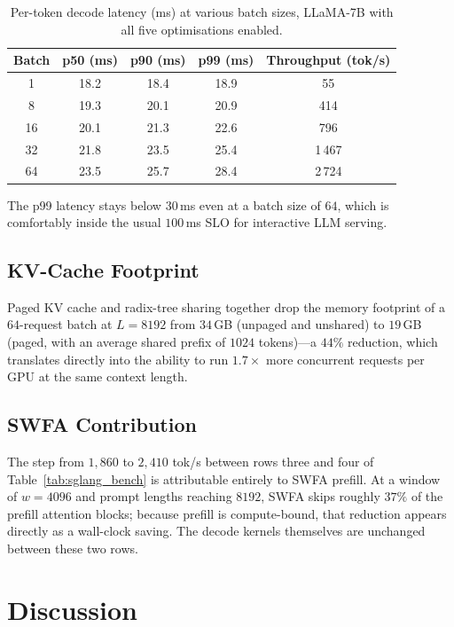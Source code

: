 \begin{table}[h]
\centering
\caption{Per-token decode latency (ms) at various batch sizes, LLaMA-7B
         with all five optimisations enabled.}
\label{tab:sglang_tail}
\begin{tabular}{ccccc}
\toprule
\textbf{Batch} & \textbf{p50 (ms)} & \textbf{p90 (ms)} & \textbf{p99 (ms)} & \textbf{Throughput (tok/s)} \\
\midrule
 1  & 18.2 & 18.4 & 18.9 &    55 \\
 8  & 19.3 & 20.1 & 20.9 &   414 \\
16  & 20.1 & 21.3 & 22.6 &   796 \\
32  & 21.8 & 23.5 & 25.4 & 1\,467 \\
64  & 23.5 & 25.7 & 28.4 & 2\,724 \\
\bottomrule
\end{tabular}
\end{table}

The p99 latency stays below $30$\,ms even at a batch size of
$64$, which is comfortably inside the usual $100$\,ms SLO for
interactive LLM serving.

\subsection{KV-Cache Footprint}\label{sec:sglang_kv_footprint}
Paged KV cache and radix-tree sharing together drop the memory
footprint of a $64$-request batch at $L = 8192$ from $34$\,GB
(unpaged and unshared) to $19$\,GB (paged, with an average shared
prefix of $1024$ tokens)---a $44\%$ reduction, which translates
directly into the ability to run $1.7\times$ more concurrent
requests per GPU at the same context length.

\subsection{SWFA Contribution}\label{sec:sglang_swfa_contrib}
The step from $1{,}860$ to $2{,}410$ tok/s between rows three and
four of Table~\ref{tab:sglang_bench} is attributable entirely to
SWFA prefill. At a window of $w = 4096$ and prompt lengths
reaching $8192$, SWFA skips roughly $37\%$ of the prefill
attention blocks; because prefill is compute-bound, that
reduction appears directly as a wall-clock saving. The decode
kernels themselves are unchanged between these two rows.

\section{Discussion}\label{sec:sglang_discussion}


